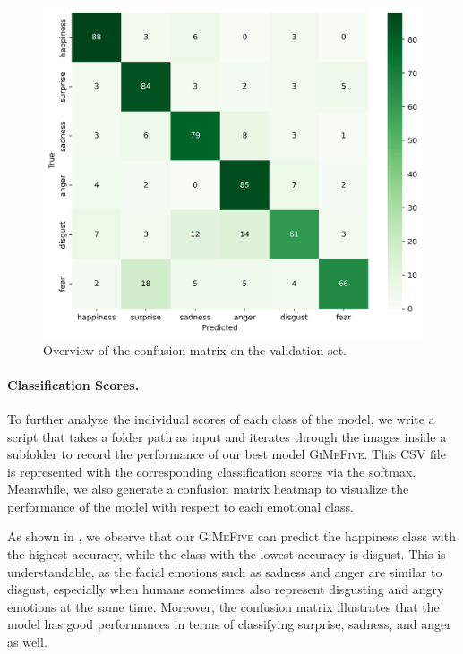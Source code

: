 \begin{figure}[ht]
  \centering
   \includegraphics[width=\linewidth]{matval.png}
   \caption{Overview of the confusion matrix on the validation set.} 
   \label{fig:matval}
\end{figure}

\paragraph{Classification Scores.} 
To further analyze the individual scores of each class of the model, 
we write a script that takes a folder path as input and iterates through the images inside a subfolder to record the performance of our best model \textsc{GiMeFive}. 
This CSV file is represented with the corresponding classification scores via the softmax. 
Meanwhile, 
we also generate a confusion matrix heatmap to visualize the performance of the model with respect to each emotional class.

As shown in , 
we observe that our \textsc{GiMeFive} can predict the happiness class with the highest accuracy, 
while the class with the lowest accuracy is disgust. 
This is understandable, 
as the facial emotions such as sadness and anger are similar to disgust, 
especially when humans sometimes also represent disgusting and angry emotions at the same time. 
Moreover, 
the confusion matrix illustrates that the model has good performances in terms of classifying surprise, sadness, and anger as well. 


